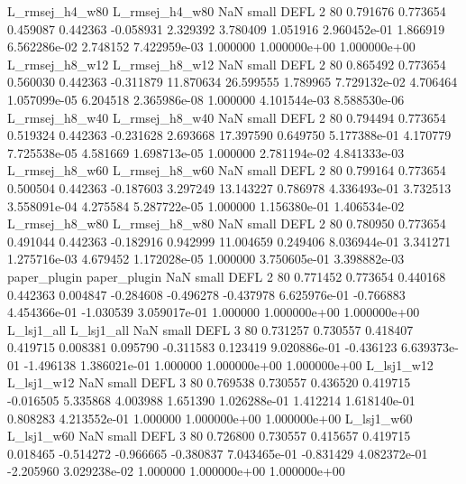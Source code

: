 L_rmsej_h4_w80 L_rmsej_h4_w80                   NaN      small     DEFL                 2 80 0.791676       0.773654 0.459087       0.442363   -0.058931      2.329392      3.780409     1.051916   2.960452e-01  1.866919 6.562286e-02     2.748152   7.422959e-03            1.000000    1.000000e+00        1.000000e+00
L_rmsej_h8_w12 L_rmsej_h8_w12                   NaN      small     DEFL                 2 80 0.865492       0.773654 0.560030       0.442363   -0.311879     11.870634     26.599555     1.789965   7.729132e-02  4.706464 1.057099e-05     6.204518   2.365986e-08            1.000000    4.101544e-03        8.588530e-06
L_rmsej_h8_w40 L_rmsej_h8_w40                   NaN      small     DEFL                 2 80 0.794494       0.773654 0.519324       0.442363   -0.231628      2.693668     17.397590     0.649750   5.177388e-01  4.170779 7.725538e-05     4.581669   1.698713e-05            1.000000    2.781194e-02        4.841333e-03
L_rmsej_h8_w60 L_rmsej_h8_w60                   NaN      small     DEFL                 2 80 0.799164       0.773654 0.500504       0.442363   -0.187603      3.297249     13.143227     0.786978   4.336493e-01  3.732513 3.558091e-04     4.275584   5.287722e-05            1.000000    1.156380e-01        1.406534e-02
L_rmsej_h8_w80 L_rmsej_h8_w80                   NaN      small     DEFL                 2 80 0.780950       0.773654 0.491044       0.442363   -0.182916      0.942999     11.004659     0.249406   8.036944e-01  3.341271 1.275716e-03     4.679452   1.172028e-05            1.000000    3.750605e-01        3.398882e-03
  paper_plugin   paper_plugin                   NaN      small     DEFL                 2 80 0.771452       0.773654 0.440168       0.442363    0.004847     -0.284608     -0.496278    -0.437978   6.625976e-01 -0.766883 4.454366e-01    -1.030539   3.059017e-01            1.000000    1.000000e+00        1.000000e+00
    L_lsj1_all     L_lsj1_all                   NaN      small     DEFL                 3 80 0.731257       0.730557 0.418407       0.419715    0.008381      0.095790     -0.311583     0.123419   9.020886e-01 -0.436123 6.639373e-01    -1.496138   1.386021e-01            1.000000    1.000000e+00        1.000000e+00
    L_lsj1_w12     L_lsj1_w12                   NaN      small     DEFL                 3 80 0.769538       0.730557 0.436520       0.419715   -0.016505      5.335868      4.003988     1.651390   1.026288e-01  1.412214 1.618140e-01     0.808283   4.213552e-01            1.000000    1.000000e+00        1.000000e+00
    L_lsj1_w60     L_lsj1_w60                   NaN      small     DEFL                 3 80 0.726800       0.730557 0.415657       0.419715    0.018465     -0.514272     -0.966665    -0.380837   7.043465e-01 -0.831429 4.082372e-01    -2.205960   3.029238e-02            1.000000    1.000000e+00        1.000000e+00
